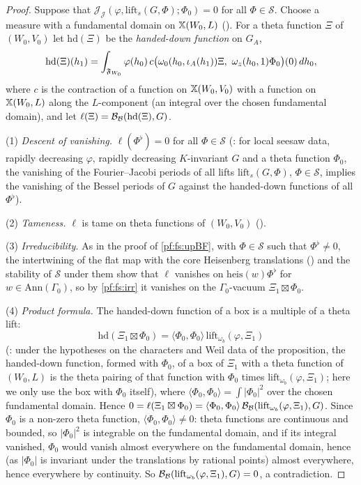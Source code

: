 \begin{proof}
Suppose that $\mathcal J_{\mathcal J}(\varphi,\mathrm{lift}_s(G,\Phi);\Phi_0)=0$ for all $\Phi\in\mathcal S$. Choose a measure with a fundamental
domain on $\mathbb X(W_0,L)$ (). For a theta function $\Xi$ of $(W_0,V_0)$ let
$\mathrm{hd}(\Xi)$ be the \emph{handed-down function} on $G_A$,
\[
\mathrm{hd}(\Xi)(h_1)=\int_{\fsF_{W_0}}\varphi(h_0)\,c\bigl(\omega_0(h_0,\iota_A(h_1))\Xi,\ \omega_z(h_0,1)\Phi_0\bigr)(0)\,dh_0,
\]
where $c$ is the contraction of a function on $\mathbb X(W_0,V_0)$ with a function on $\mathbb X(W_0,L)$ along the $L$-component (an integral over the
chosen fundamental domain), and let $\ell(\Xi)=\mathcal B_{\mathcal B}(\mathrm{hd}(\Xi),G)$.

(1) \emph{Descent of vanishing.} $\ell(\Phi^\flat)=0$ for all $\Phi\in\mathcal S$
(: for local seesaw data, rapidly decreasing $\varphi$, rapidly decreasing
$K$-invariant $G$ and a theta function $\Phi_0$, the vanishing of the Fourier--Jacobi periods of all lifts $\mathrm{lift}_s(G,\Phi)$,
$\Phi\in\mathcal S$, implies the vanishing of the Bessel periods of $G$ against the handed-down functions of all $\Phi^\flat$).

(2) \emph{Tameness.} $\ell$ is tame on theta functions of $(W_0,V_0)$
().

(3) \emph{Irreducibility.} As in the proof of \cref{pf:fs:upBF}, with $\Phi\in\mathcal S$ such that $\Phi^\flat\ne0$, the intertwining of the
flat map with the core Heisenberg translations () and the stability of $\mathcal S$ under them
show that $\ell$ vanishes on $\mathrm{heis}(w)\Phi^\flat$ for $w\in\mathrm{Ann}(\Gamma_0)$, so by \cref{pf:fs:irr} it vanishes on the
$\Gamma_0$-vacuum $\Xi_1\boxtimes\Phi_0$.

(4) \emph{Product formula.} The handed-down function of a box is a multiple of a theta lift:
\[
\mathrm{hd}(\Xi_1\boxtimes\Phi_0)=\langle\Phi_0,\Phi_0\rangle\,\mathrm{lift}_{\omega_b}(\varphi,\Xi_1)
\]
(: under the hypotheses on the characters and Weil data of the
proposition, the handed-down function, formed with $\Phi_0$, of a box of $\Xi_1$ with a theta function of $(W_0,L)$ is the theta pairing of
that function with $\Phi_0$ times $\mathrm{lift}_{\omega_b}(\varphi,\Xi_1)$; here we only use the box with $\Phi_0$ itself), where
$\langle\Phi_0,\Phi_0\rangle=\int|\Phi_0|^2$ over the chosen fundamental domain. Hence
$0=\ell(\Xi_1\boxtimes\Phi_0)=\langle\Phi_0,\Phi_0\rangle\,\mathcal B_{\mathcal B}(\mathrm{lift}_{\omega_b}(\varphi,\Xi_1),G)$. Since $\Phi_0$ is a non-zero
theta function, $\langle\Phi_0,\Phi_0\rangle\ne0$: theta functions are continuous and bounded, so $|\Phi_0|^2$ is integrable on the fundamental
domain, and if its integral vanished, $\Phi_0$ would vanish almost everywhere on the fundamental domain, hence (as $|\Phi_0|$ is invariant
under the translations by rational points) almost everywhere, hence everywhere by continuity. So
$\mathcal B_{\mathcal B}(\mathrm{lift}_{\omega_b}(\varphi,\Xi_1),G)=0$, a contradiction.
\end{proof}

